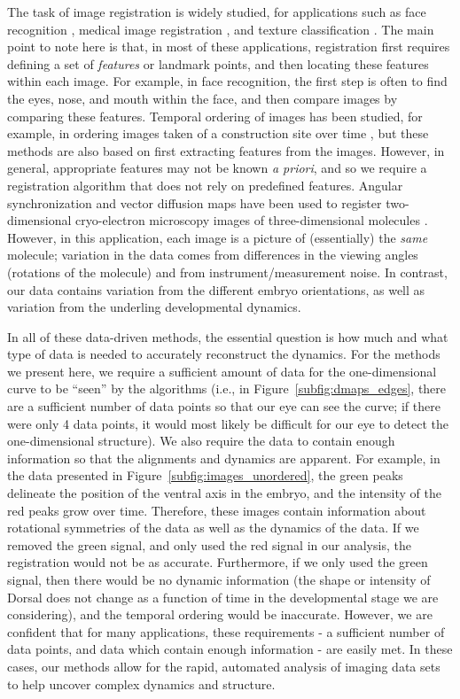 \documentclass{pnastwo}
\begin{document}
\begin{article}
The task of image registration is widely studied, for applications such as face recognition \cite{rowley1998rotation}, medical image registration \cite{hajnal2010medical}, and texture classification \cite{greenspan1994rotation}.
%
The main point to note here is that, in most of these applications, registration first requires defining a set of {\em features} or landmark points, and then locating these features within each image.
%
For example, in face recognition, the first step is often to find the eyes, nose, and mouth within the face, and then compare images by comparing these features.
%
Temporal ordering of images has been studied, for example, in ordering images taken of a construction site over time \cite{schindler2007inferring}, 
but these methods are also based on first extracting features from the images. 
%
However, in general, appropriate features may not be known {\em a priori}, and so we require a registration algorithm that does not rely on predefined features.
%
Angular synchronization and vector diffusion maps have been used to register two-dimensional cryo-electron microscopy images of three-dimensional molecules \cite{singer2011three}.
%
However, in this application, each image is a picture of (essentially) the {\em same} molecule; variation in the data comes from differences in the viewing angles (rotations of the molecule) and from instrument/measurement noise.
%
In contrast, our data contains variation from the different embryo orientations, as well as variation from the underling developmental dynamics. 

In all of these data-driven methods, the essential question is how much and what type of data is needed to accurately reconstruct the dynamics. 
%
For the methods we present here, we require a sufficient amount of data for the one-dimensional curve to be ``seen'' by the algorithms (i.e., in Figure~\ref{subfig:dmaps_edges}, there are a sufficient number of data points so that our eye can see the curve; if there were only 4 data points, it would most likely be difficult for our eye to detect the one-dimensional structure).
%
We also require the data to contain enough information so that the alignments and dynamics are apparent.
%
For example, in the data presented in Figure~\ref{subfig:images_unordered}, the green peaks delineate the position of the ventral axis in the embryo, and the intensity of the red peaks grow over time.
%
Therefore, these images contain information about rotational symmetries of the data as well as the dynamics of the data.
%
If we removed the green signal, and only used the red signal in our analysis, the registration would not be as accurate.
%
Furthermore, if we only used the green signal, then there would be no dynamic information (the shape or intensity of Dorsal does not change as a function of time in the developmental stage we are considering), and the temporal ordering would be inaccurate.
%
However, we are confident that for many applications, these requirements - a sufficient number of data points, and data which contain enough information - are easily met. 
%
In these cases, our methods allow for the rapid, automated analysis of imaging data sets to help uncover complex dynamics and structure. 


\end{article}
\end{document}
